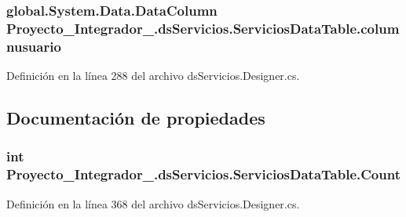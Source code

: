 \hypertarget{class_proyecto___integrador__3_1_1ds_servicios_1_1_servicios_data_table_a528b90d784325ac1cebec3c973dcd0e4}{
\subsubsection[{columnusuario}]{\setlength{\rightskip}{0pt plus 5cm}global.\-System.\-Data.\-Data\-Column Proyecto\-\_\-\-Integrador\-\_.\-ds\-Servicios.\-Servicios\-Data\-Table.\-columnusuario\hspace{0.3cm}{\ttfamily [private]}}}\label{class_proyecto___integrador__3_1_1ds_servicios_1_1_servicios_data_table_a528b90d784325ac1cebec3c973dcd0e4}


Definición en la línea 288 del archivo ds\-Servicios.\-Designer.\-cs.



\subsection{Documentación de propiedades}
\hypertarget{class_proyecto___integrador__3_1_1ds_servicios_1_1_servicios_data_table_a2e0a353b5ce0c1a3718e78927b5a180c}{
\subsubsection[{Count}]{\setlength{\rightskip}{0pt plus 5cm}int Proyecto\-\_\-\-Integrador\-\_.\-ds\-Servicios.\-Servicios\-Data\-Table.\-Count\hspace{0.3cm}{\ttfamily [get]}}}\label{class_proyecto___integrador__3_1_1ds_servicios_1_1_servicios_data_table_a2e0a353b5ce0c1a3718e78927b5a180c}


Definición en la línea 368 del archivo ds\-Servicios.\-Designer.\-cs.

